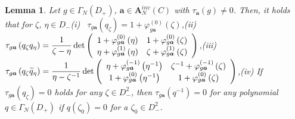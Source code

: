 \documentclass[a4paper]{article}%
\newtheorem{lemma}{Lemma}
\begin{document}
\begin{lemma}
\label{l2-11}Let $g\in\Gamma_{N}\left(  D_{+}\right)  $, $\boldsymbol{a}%
\in\boldsymbol{A}_{N}^{inv}\left(  C\right)  $ with $\tau_{\boldsymbol{a}%
}\left(  g\right)  \neq0$. Then, it holds that for $\zeta$, $\eta\in D_{-}%
$\newline(i) \ $\tau_{g\boldsymbol{a}}\left(  q_{\zeta}\right)  =1+\varphi
_{g\boldsymbol{a}}^{\left(  0\right)  }\left(  \zeta\right)  $,\newline(ii)
$\tau_{g\boldsymbol{a}}\left(  q_{\zeta}q_{\eta}\right)  =\dfrac{1}{\zeta
-\eta}\det\left(
\begin{array}
[c]{cc}%
1+\varphi_{g\boldsymbol{a}}^{\left(  0\right)  }\left(  \eta\right)  &
1+\varphi_{g\boldsymbol{a}}^{\left(  0\right)  }\left(  \zeta\right) \\
\eta+\varphi_{g\boldsymbol{a}}^{\left(  1\right)  }\left(  \eta\right)  &
\zeta+\varphi_{g\boldsymbol{a}}^{\left(  1\right)  }\left(  \zeta\right)
\end{array}
\right)  $,\newline(iii) $\tau_{g\boldsymbol{a}}\left(  q_{\zeta}\widetilde
{q}_{\eta}\right)  =\dfrac{1}{\eta-\zeta^{-1}}\det\left(
\begin{array}
[c]{cc}%
\eta+\varphi_{g\boldsymbol{a}}^{\left(  -1\right)  }\left(  \eta^{-1}\right)
& \zeta^{-1}+\varphi_{g\boldsymbol{a}}^{\left(  -1\right)  }\left(
\zeta\right) \\
1+\varphi_{g\boldsymbol{a}}^{\left(  0\right)  }\left(  \eta^{-1}\right)  &
1+\varphi_{g\boldsymbol{a}}^{\left(  0\right)  }\left(  \zeta\right)
\end{array}
\right)  $,\newline(iv) If $\tau_{g\boldsymbol{a}}\left(  q_{\zeta}\right)
=0$ holds for any $\zeta\in D_{-}^{2}$, then $\tau_{g\boldsymbol{a}}\left(
q^{-1}\right)  =0$ for any polynomial $q\in\Gamma_{N}\left(  D_{+}\right)  $
if $q\left(  \zeta_{0}\right)  =0$ for a $\zeta_{0}\in D_{-}^{2}$.
\end{lemma}
\end{document}

